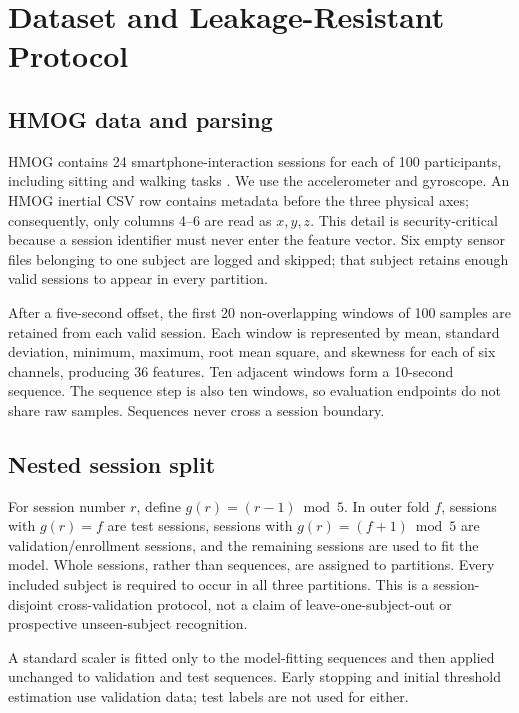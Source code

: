 \documentclass[3p,times,procedia]{elsarticle}
\begin{document}
\section{Dataset and Leakage-Resistant Protocol}
\label{sec:data}

\subsection{HMOG data and parsing}

HMOG contains 24 smartphone-interaction sessions for each of 100 participants,
including sitting and walking tasks \cite{sitova_hmog_2016}. We use the
accelerometer and gyroscope. An HMOG inertial CSV row contains metadata before
the three physical axes; consequently, only columns 4--6 are read as $x,y,z$.
This detail is security-critical because a session identifier must never enter
the feature vector. Six empty sensor files belonging to one subject are logged
and skipped; that subject retains enough valid sessions to appear in every
partition.

After a five-second offset, the first 20 non-overlapping windows of 100 samples
are retained from each valid session. Each window is represented by mean,
standard deviation, minimum, maximum, root mean square, and skewness for each of
six channels, producing 36 features. Ten adjacent windows form a 10-second
sequence. The sequence step is also ten windows, so evaluation endpoints do not
share raw samples. Sequences never cross a session boundary.

\subsection{Nested session split}

For session number $r$, define $g(r)=(r-1)\bmod 5$. In outer fold $f$, sessions
with $g(r)=f$ are test sessions, sessions with
$g(r)=(f+1)\bmod 5$ are validation/enrollment sessions, and the remaining
sessions are used to fit the model. Whole sessions, rather than sequences, are
assigned to partitions. Every included subject is required to occur in all
three partitions. This is a session-disjoint cross-validation protocol, not a
claim of leave-one-subject-out or prospective unseen-subject recognition.

A standard scaler is fitted only to the model-fitting sequences and then
applied unchanged to validation and test sequences. Early stopping and initial
threshold estimation use validation data; test labels are not used for either.
\end{document}

